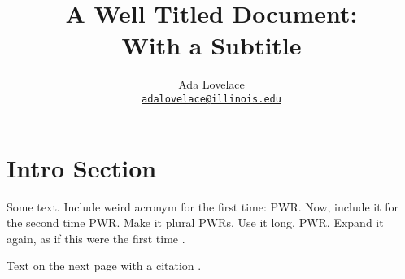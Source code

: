 \documentclass[letterpaper]{article}
\author{Ada Lovelace
        \\ \href{mailto:adalovelace@illinois.edu}{\texttt{adalovelace@illinois.edu}}
}
\date{}
\title{A Well Titled Document:\\
With a Subtitle}
\begin{document}
\maketitle
\section{Intro Section}
Some text. Include weird acronym for the first time: \gls{PWR}.
Now, include it for the second time \gls{PWR}.
Make it plural \glspl{PWR}.
Use it long, \glsdesc{PWR}.
Expand it again, as if this were the first time .

\pagebreak

Text on the next page with a  citation \cite{whitesides_whitesides_2004}.




\end{document}
